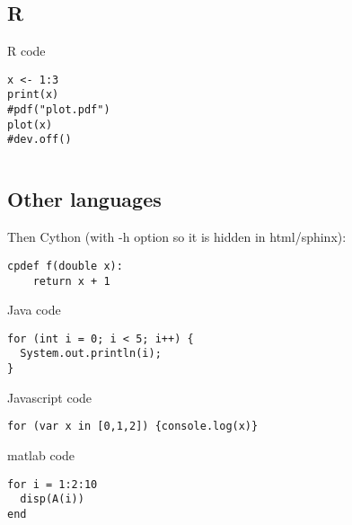 \documentclass[%
oneside,                 %
final,                   %
chapterprefix=true,      %
open=right,              %
10pt]{book}
\begin{document}
\subsection{R }

R code







\begin{Verbatim}[numbers=none,fontsize=\fontsize{9pt}{9pt},baselinestretch=0.95]
x <- 1:3
print(x)
#pdf("plot.pdf")
plot(x)
#dev.off()

\end{Verbatim}

\begin{Verbatim}[numbers=none,fontsize=\fontsize{9pt}{9pt},baselinestretch=0.95]
\end{Verbatim}

\subsection{Other languages}

Then Cython (with -h option so it is hidden in html/sphinx):




\begin{Verbatim}[numbers=none,fontsize=\fontsize{9pt}{9pt},baselinestretch=0.95]
cpdef f(double x):
    return x + 1

\end{Verbatim}


Java code




\begin{Verbatim}[numbers=none,fontsize=\fontsize{9pt}{9pt},baselinestretch=0.95]
for (int i = 0; i < 5; i++) {
  System.out.println(i);
}

\end{Verbatim}


Javascript code


\begin{Verbatim}[numbers=none,fontsize=\fontsize{9pt}{9pt},baselinestretch=0.95]
for (var x in [0,1,2]) {console.log(x)}

\end{Verbatim}


matlab code




\begin{Verbatim}[numbers=none,fontsize=\fontsize{9pt}{9pt},baselinestretch=0.95]
for i = 1:2:10
  disp(A(i))
end

\end{Verbatim}
\end{document}
